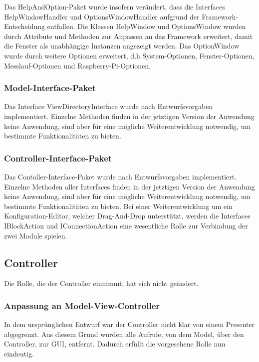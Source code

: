 \documentclass[parskip=full]{scrartcl}
\begin{document}
Das HelpAndOption-Paket wurde insofern verändert, dass die Interfaces HelpWindowHandler und OptionsWindowHandler aufgrund der Framework-Entscheidung entfallen.
Die Klassen HelpWindow und OptionsWindow wurden durch Attribute und Methoden zur Anpassen an das Framework erweitert, damit die Fenster als unabhängige Instanzen angezeigt werden. Das OptionWindow wurde durch weitere Optionen erweitert, d.h System-Optionen, Fenster-Optionen, Messlauf-Optionen und Raspberry-Pi-Optionen.

\subsubsection{Model-Interface-Paket}

Das Interface ViewDirectoryInterface wurde nach Entwurfsvorgaben implementiert. Einzelne Methoden finden in der jetztigen Version der Anwendung keine Anwendung, sind aber für eine mögliche Weiterentwicklung notwendig, um bestimmte Funktionalitäten zu bieten.

\subsubsection{Controller-Interface-Paket}

Das Contoller-Interface-Paket wurde nach Entwurfsvorgaben implementiert. Einzelne Methoden aller Interfaces finden in der jetztigen Version der Anwendung keine Anwendung, sind aber für eine mögliche Weiterentwicklung notwendig, um bestimmte Funktionalitäten zu bieten. Bei einer Weiterentwicklung um ein Konfiguration-Editor, welcher Drag-And-Drop unterstützt, werden die Interfaces IBlockAction und IConnectionAction eine wesentliche Rolle zur Verbindung der zwei Module spielen.

\subsection{Controller}

Die Rolle, die der Controller einnimmt, hat sich nicht geändert.

\subsubsection{Anpassung an Model-View-Controller}
In dem ursprünglichen Entwurf war der Controller nicht klar von einem \gls{Presenter} abgegrenzt. Aus diesem Grund wurden alle Aufrufe, von dem Model, über den Controller, zur GUI, entfernt. Dadurch erfüllt die vorgesehene Rolle nun eindeutig.
\end{document}
